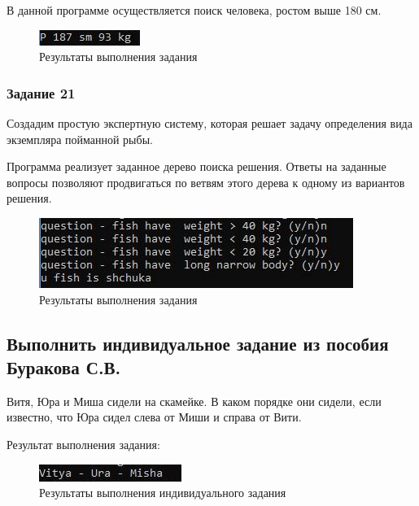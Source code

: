 \documentclass[14pt,a4paper,report]{report}
\begin{document}
В данной программе осуществляется поиск человека, ростом выше 180 см. 



\begin{figure}[h!]
	\centering
	\includegraphics[scale = 1.0]{images/d20.jpeg}
	\caption{Результаты выполнения задания}
\end{figure}

\subsubsection{Задание 21}

Создадим простую экспертную систему, которая решает задачу определения вида экземпляра пойманной рыбы.

Программа реализует заданное дерево поиска решения. Ответы на заданные вопросы позволяют продвигаться по ветвям этого дерева к одному из вариантов решения.



\begin{figure}[h!]
	\centering
	\includegraphics[scale = 1.0]{images/d21.jpeg}
	\caption{Результаты выполнения задания}
\end{figure}



\subsection{Выполнить индивидуальное задание из пособия Буракова С.В.}


Витя, Юра и Миша сидели на скамейке. В каком порядке они сидели, если известно, что Юра сидел слева от Миши и справа от Вити.





Результат выполнения задания:

\begin{figure}[h!]
	\centering
	\includegraphics[scale = 1.0]{images/i1.jpeg}
	\caption{Результаты выполнения индивидуального задания}
\end{figure}
\end{document}
